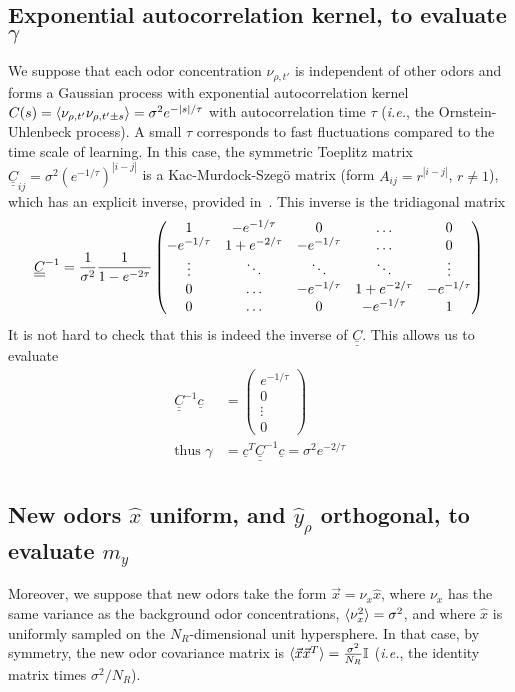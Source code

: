 \documentclass[letter, 12pt]{article}
\def\beq{ \begin{equation} }		%
\def\eeq{ \end{equation} } 			%
\def\ie{\textit{i.e.}, }
\newcommand{\dul}[1]{\underline{\underline{#1}}}
\begin{document}
\subsection{Exponential autocorrelation kernel, to evaluate $\gamma$}
We suppose that each odor concentration $\nu_{\rho, t'}$ is independent of other odors and forms a Gaussian process with exponential autocorrelation kernel $C(s) = \braket{\nu_{\rho, t'} \nu_{\rho, t' \pm s}} =\sigma^2 e^{-|s|/\tau}$ with autocorrelation time $\tau$ (\ie the Ornstein-Uhlenbeck process). A small $\tau$ corresponds to fast fluctuations compared to the time scale of learning. In this case, the symmetric Toeplitz matrix $\dul{C}_{ij} = \sigma^2 (e^{-1/\tau})^{|i-j|}$ is a Kac-Murdock-Szeg\"o matrix (form $A_{ij} = r^{|i-j|}$, $r \neq 1$), which has an explicit inverse, provided in~\cite[sec.~1.3]{dow_explicit_2003}. This inverse is the tridiagonal matrix
\beq
\dul{C}^{-1} = \frac{1}{\sigma^2} \frac{1}{1 - e^{-2\tau}} \begin{pmatrix}
		1 & -e^{-1/\tau} & 0 & \ldots &  0 \\
		-e^{-1/\tau} & 1 + e^{-2/\tau} & -e^{-1/\tau} & \ldots &0  \\
		\vdots & \ddots & \ddots & \ddots  & \vdots  \\
		0 & \ldots & -e^{-1/\tau} & 1 + e^{-2/\tau} & -e^{-1/\tau} \\
		0 & \ldots & 0 & -e^{-1/\tau} & 1 \\
	\end{pmatrix} \nonumber \\
\eeq
It is not hard to check that this is indeed the inverse of $\dul{C}$. This allows us to evaluate
\begin{align*}
	\dul{C}^{-1} \underline{c} &= \begin{pmatrix} e^{-1/\tau} \\ 0 \\ \vdots \\ 0 \end{pmatrix} \\
	\text{thus } \gamma &= \underline{c}^T \dul{C}^{-1} \underline{c} = \sigma^2 e^{-2/\tau}  \\
\end{align*}

\subsection{New odors $\hat{x}$ uniform, and $\hat{y}_{\rho}$ orthogonal, to evaluate $m_y$}
Moreover, we suppose that new odors take the form $\vec{x} = \nu_x \hat{x}$, where $\nu_x$ has the same variance as the background odor concentrations, $\braket{\nu_x^2} = \sigma^2$, and where $\hat{x}$ is uniformly sampled on the $N_R$-dimensional unit hypersphere. In that case, by symmetry, the new odor covariance matrix is $\braket{\vec{x} \vec{x}^T} = \frac{\sigma^2}{N_R} \mathbb{I}$ (\ie the identity matrix times $\sigma^2/N_R$). 
\end{document}
